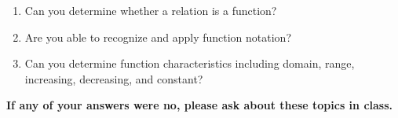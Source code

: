 \begin{enumerate}
\item Can you determine whether a relation is a function?
\item Are you able to recognize and apply function notation?
\item Can you determine function characteristics including domain, range, increasing, decreasing, and constant?
\end{enumerate}

\noindent \textbf{If any of your answers were no, please ask about these topics in class.}



